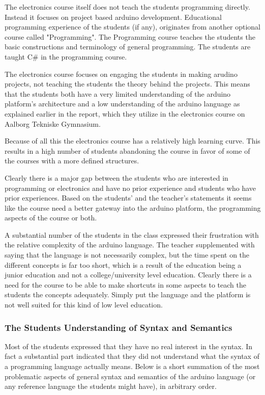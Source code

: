 The electronics course itself does not teach the students programming directly. 
Instead it focuses on project based arduino development. 
Educational programming experience of the students (if any), originates from another optional course called "Programming". 
The Programming course teaches the students the basic constructions and terminology of general programming. 
The students are taught C{\#} in the programming course. 

The electronics course focuses on engaging the students in making arudino projects, not teaching the students the theory behind the projects. 
This means that the students both have a very limited understanding of the arduino platform's architecture and a low understanding of the arduino language as explained earlier in the report, which they utilize in the electronics course on Aalborg Tekniske Gymnasium.

Because of all this the electronics course has a relatively high learning curve. 
This results in a high number of students abandoning the course in favor of some of the courses with a more defined structures.

Clearly there is a major gap between the students who are interested in programming or electronics and have no prior experience and students who have prior experiences. 
Based on the students' and the teacher's statements it seems like the course need a better gateway into the arduino platform, the programming aspects of the course or both.

A substantial number of the students in the class expressed their frustration with the relative complexity of the arduino language. 
The teacher supplemented with saying that the language is not necessarily complex, but the time spent on the different concepts is far too short, which is a result of the education being a junior education and not a college/university level education.
Clearly there is a need for the course to be able to make shortcuts in some aspects to teach the students the concepts adequately. 
Simply put the language and the platform is not well suited for this kind of low level education.

\subsubsection{The Students Understanding of Syntax and Semantics}
Most of the students expressed that they have no real interest in the syntax. 
In fact a substantial part indicated that they did not understand what the syntax of a programming language actually means. 
Below is a short summation of the most problematic aspects of general syntax and semantics of the arduino language (or any reference language the students might have), in arbitrary order.

